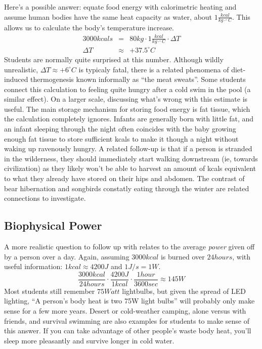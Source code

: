 \documentclass[12pt]{iopart}
\newcommand{\be}{\begin{equation}}
\newcommand{\ee}{\end{equation}}
\newcommand{\bea}{\begin{eqnarray}}
\newcommand{\eea}{\end{eqnarray}}
\newcommand{\degC}{^{\circ}C}
\begin{document}
Here's a possible answer:
equate food energy with calorimetric heating and assume human bodies have the same heat capacity as water, about $1\frac{kcal}{kg\cdot\degC}$. This allows us to calculate the body's temperature increase.
\bea
3000kcals &=& 80kg\cdot1 \frac{kcal}{kg\cdot \degC}\cdot\Delta T\\
\Delta T &\approx& +37.5\degC
\eea
Students are normally quite surprised at this number.  Although wildly unrealistic, $\Delta T \approx +6\degC$ is typicaly fatal, there is a related phenomena of diet-induced thermogenesis\cite{meat_sweats} known informally as ``the meat sweats''. Some students connect this calculation to feeling quite hungry after a cold swim in the pool (a similar effect).  On a larger scale, discussing what's wrong with this estimate is useful.  The main storage mechanism for storing food energy is fat tissue, which the calculation completely ignores.  Infants are generally born with little fat, and an infant sleeping through the night often coincides with the baby growing enough fat tissue to store sufficient kcals to make it though a night without waking up ravenously hungry.  A related follow-up is that if a person is stranded in the wilderness, they should immediately start walking downstream (ie, towards civilization) as they likely won't be able to harvest an amount of kcals equivalent to what they already have stored on their hips and abdomen.\cite{trout}  The contrast of bear hibernation \cite{fat_bear} and songbirds constatly eating through the winter are related connections to investigate.

\subsection{Biophysical Power}
A more realistic question to follow up with relates to the average \textit{power} given off by a person over a day.  
Again, assuming $3000kcal$ is burned over $24 hours$, with useful information: $1 kcal \approx 4200J$ and $1 J/s=1W$.
\be
\frac{3000kcal}{24hours}\cdot\frac{4200J}{1kcal}\cdot\frac{1hour}{3600sec}\approx145W
\ee
Most students still remember $75Watt$ lightbulbs, but given the spread of LED lighting, ``A person's body heat is two 75W light bulbs'' will probably only make sense for a few more years.  Desert or cold-weather camping, alone versus with friends, and survival swimming are also examples for students to make sense of this answer.  If you can take advantage of other people's waste body heat, you'll sleep more pleasantly and survive longer in cold water.  
\end{document}
